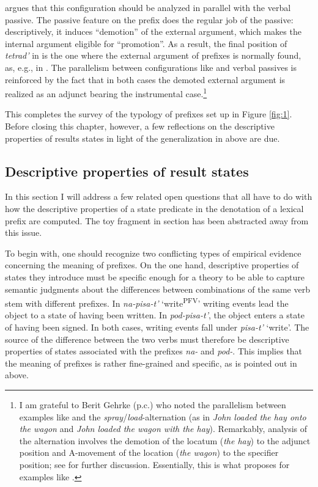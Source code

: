 \documentclass[output=paper,colorlinks,citecolor=brown]{langscibook}
\begin{document}
\citet[110ff.]{Romanova2007} argues that this configuration should be analyzed in parallel with the verbal passive. The passive feature on the prefix does the regular job of the passive: descriptively, it induces “demotion” of the external argument, which makes the internal argument eligible for “promotion”. As a result, the final position of \textit{tetrad’} in  is the one where the external argument of prefixes is normally found, as, e.g., in . The parallelism between configurations like  and verbal passives is reinforced by the fact that in both cases the demoted external argument is realized as an adjunct bearing the instrumental case.\footnote{I am grateful to Berit Gehrke (p.c.) who noted the parallelism between examples like  and the \textit{spray}/\textit{load}-alternation (as in \textrm{\textit{John loaded the hay onto the wagon}} \textrm{and} \textrm{\textit{John loaded the wagon with the hay}}). Remarkably,  analysis of the alternation involves the demotion of the locatum (\textit{the hay}) to the adjunct position and A-movement of the location (\textit{the wagon}) to the specifier position; see \citet{Beavers2017} for further discussion. Essentially, this is what \citet{Romanova2007} proposes for examples like .}

This completes the survey of the typology of prefixes set up in Figure \ref{fig:1}. Before closing this chapter, however, a few reflections on the descriptive properties of results states in light of the generalization in  above are due.

\subsection{Descriptive properties of result states}\label{sec:3.4}
\hypertarget{RefHeadingToc164647633}{}
In this section I will address a few related open questions that all have to do with how the descriptive properties of a state predicate in the denotation of a lexical prefix are computed. The toy fragment in section  has been abstracted away from this issue.

To begin with, one should recognize two conflicting types of empirical evidence concerning the meaning of prefixes. On the one hand, descriptive properties of states they introduce must be specific enough for a theory to be able to capture semantic judgments about the differences between combinations of the same verb stem with different prefixes. In \textit{na-pisa-t’} ‘write\textsuperscript{PFV}’ writing events lead the object to a state of having been written. In \textit{pod-pisa-t’}, the object enters a state of having been signed. In both cases, writing events fall under \textit{pisa-t’} ‘write’. The source of the difference between the two verbs must therefore be descriptive properties of states associated with the prefixes \textit{na-} and \textit{pod-}. This implies that the meaning of prefixes is rather fine-grained and specific, as is pointed out in  above. 
\end{document}
